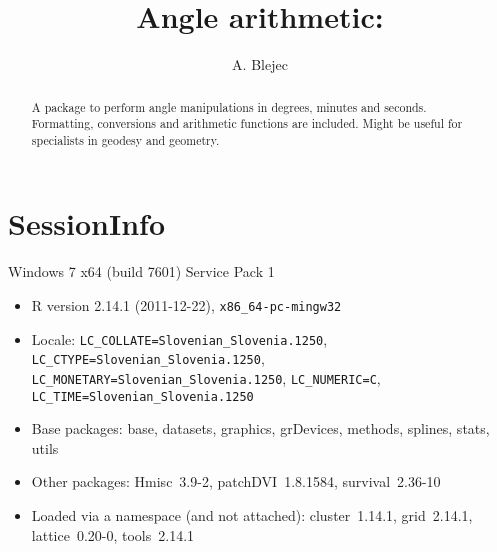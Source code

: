 \documentclass[a4paper,12pt]{article}
\begin{document}
\title{Angle arithmetic: }
\author{A. Blejec}
%

\maketitle
\begin{abstract}
A package to perform angle manipulations in degrees, minutes and seconds. Formatting, conversions and arithmetic functions are included. Might be useful for specialists in geodesy and geometry.
\end{abstract}
\tableofcontents

%



%
%

%

\clearpage
\section*{SessionInfo}
Windows 7 x64 (build 7601) Service Pack 1 \begin{itemize}\raggedright
  \item R version 2.14.1 (2011-12-22), \verb|x86_64-pc-mingw32|
  \item Locale: \verb|LC_COLLATE=Slovenian_Slovenia.1250|, \verb|LC_CTYPE=Slovenian_Slovenia.1250|, \verb|LC_MONETARY=Slovenian_Slovenia.1250|, \verb|LC_NUMERIC=C|, \verb|LC_TIME=Slovenian_Slovenia.1250|
  \item Base packages: base, datasets, graphics, grDevices,
    methods, splines, stats, utils
  \item Other packages: Hmisc~3.9-2, patchDVI~1.8.1584,
    survival~2.36-10
  \item Loaded via a namespace (and not attached):
    cluster~1.14.1, grid~2.14.1, lattice~0.20-0, tools~2.14.1
\end{itemize}
\end{document}
